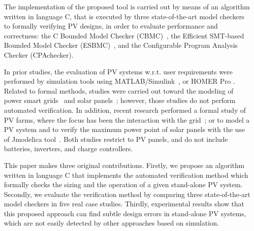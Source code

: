 \documentclass[review]{elsarticle}
\begin{document}
The implementation of the proposed tool is carried out by means of an algorithm written in language C, that is executed by three state-of-the-art model checkers to formally verifying PV designs, in order to evaluate performance and correctness: the C Bounded Model Checker (CBMC)~\cite{Kroening}, the Efficient SMT-based Bounded Model Checker (ESBMC)~\cite{esbmc2018}, and the Configurable Program Analysis Checker (CPAchecker).

In prior studies, the evaluation of PV systems w.r.t. user requirements were performed by simulation tools using MATLAB/Simulink~\cite{Benatiallah2017, Natsheh2012}, or HOMER Pro \cite{Lamnadi2017}. Related to formal methods, studies were carried out toward the modeling of power smart grids~\cite{Akram2018} and solar panels~\cite{Driouich2017}; however, those studies do not perform automated verification. 
%
In addition, recent research performed a formal study of PV farms, where the focus has been the interaction with the grid~\cite{Abate2017}; or to model a PV system and to verify the maximum power point of solar panels with the use of Jmodelica tool~\cite{Driouich2018}. Both studies restrict to PV panels, and do not include batteries, inverters, and charge controllers.
  
This paper makes three original contributions. %
Firstly, we propose an algorithm written in language C that implements the automated verification method which formally checks the sizing and the operation of a given stand-alone PV system. Secondly, we evaluate the verification method by comparing three state-of-the-art model checkers in five real case studies. Thirdly, experimental results show that this proposed approach can find subtle design errors in stand-alone PV systems, which are not easily detected by other approaches based on simulation. 
\end{document}
